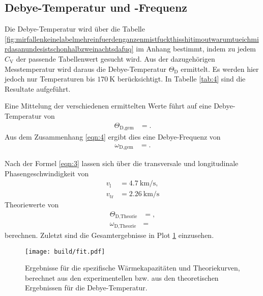 

\subsection{Debye-Temperatur und -Frequenz}

Die Debye-Temperatur wird über die Tabelle \ref{fig:mirfallenkeinelabelmehreinfuerdenganzenmistfuckthisshitimoutwarumtueichmirdasanundesistschonhalbzweinachtsdafuq} im Anhang bestimmt, indem zu jedem $C_{\text{V}}$ der passende Tabellenwert gesucht wird.
Aus der dazugehörigen Messtemperatur wird daraus die Debye-Temperatur $\Theta_\text{D}$ ermittelt.
Es werden hier jedoch nur Temperaturen bis $\SI{170}{\kelvin}$ berücksichtigt.
In Tabelle \ref{tab:4} sind die Resultate aufgeführt.



Eine Mittelung der verschiedenen ermittelten Werte führt auf eine Debye-Temperatur von
\begin{align*}
  \Theta_{\text{D,gem}} &= .
\end{align*}
Aus dem Zusammenhang \eqref{eqn:4} ergibt dies eine Debye-Frequenz von
\begin{align*}
  \omega_{\text{D,gem}} &= .
\end{align*}

Nach der Formel \eqref{eqn:3} lassen sich über die transversale und longitudinale Phasengeschwindigkeit \cite{skript} von
\begin{align*}
  v_{\text{l}}  &= \SI{4.7}{\kilo\meter\per\second},\\
  v_{\text{tr}} &= \SI{2.26}{\kilo\meter\per\second}
\end{align*}
Theoriewerte von
\begin{align*}
  \Theta_{\text{D,Theorie}} &= ,\\
  \omega_{\text{D,Theorie}} &= 
\end{align*}
berechnen.
Zuletzt sind die Gesamtergebnisse in Plot \ref{plot:1} einzusehen.

\begin{figure}
  \centering
  \texttt{[image: build/fit.pdf]}
  \caption{Ergebnisse für die spezifische Wärmekapazitäten und Theoriekurven, berechnet aus den experimentellen bzw. aus den theoretischen Ergebnissen für die Debye-Temperatur.}
  \label{plot:1}
\end{figure}
